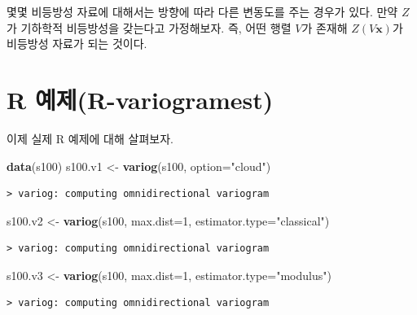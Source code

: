 \documentclass[b5paper,]{scrbook}
\makeatletter
\newenvironment{Shaded}{\begin{snugshade}}{\end{snugshade}}
\newcommand{\DataTypeTok}[1]{\textcolor[rgb]{0.13,0.29,0.53}{#1}}
\newcommand{\DecValTok}[1]{\textcolor[rgb]{0.00,0.00,0.81}{#1}}
\newcommand{\KeywordTok}[1]{\textcolor[rgb]{0.13,0.29,0.53}{\textbf{#1}}}
\newcommand{\NormalTok}[1]{#1}
\newcommand{\StringTok}[1]{\textcolor[rgb]{0.31,0.60,0.02}{#1}}
\theoremstyle{plain}
\theoremstyle{definition}
\numberwithin{equation}{section}
\newenvironment{kframe}{%
\medskip{}
\setlength{\fboxsep}{.8em}
 \def\at@end@of@kframe{}%
 \ifinner\ifhmode%
  \def\at@end@of@kframe{\end{minipage}}%
  \begin{minipage}{\columnwidth}%
 \fi\fi%
 \def\FrameCommand##1{\hskip\@totalleftmargin \hskip-\fboxsep
 \colorbox{shadecolor}{##1}\hskip-\fboxsep
     \hskip-\linewidth \hskip-\@totalleftmargin \hskip\columnwidth}%
 \MakeFramed {\advance\hsize-\width
   \@totalleftmargin\z@ \linewidth\hsize
   \@setminipage}}%
 {\par\unskip\endMakeFramed%
 \at@end@of@kframe}
\renewenvironment{Shaded}{\begin{kframe}}{\end{kframe}}
\makeatother
\begin{document}
몇몇 비등방성 자료에 대해서는 방향에 따라 다른 변동도를 주는 경우가 있다. 만약 \(Z\)가 기하학적 비등방성을 갖는다고 가정해보자. 즉, 어떤 행렬 \(V\)가 존재해 \(Z(V\mathbf{x})\)가 비등방성 자료가 되는 것이다.

\hypertarget{r-r-variogramest}{%
\section{R 예제(R-variogramest)}\label{r-r-variogramest}}

이제 실제 R 예제에 대해 살펴보자.

\begin{Shaded}
\begin{Highlighting}[]
\KeywordTok{data}\NormalTok{(s100)}
\NormalTok{s100.v1 <-}\StringTok{ }\KeywordTok{variog}\NormalTok{(s100, }\DataTypeTok{option=}\StringTok{"cloud"}\NormalTok{)}
\end{Highlighting}
\end{Shaded}

\begin{verbatim}
> variog: computing omnidirectional variogram
\end{verbatim}

\begin{Shaded}
\begin{Highlighting}[]
\NormalTok{s100.v2 <-}\StringTok{ }\KeywordTok{variog}\NormalTok{(s100, }\DataTypeTok{max.dist=}\DecValTok{1}\NormalTok{, }\DataTypeTok{estimator.type=}\StringTok{"classical"}\NormalTok{)}
\end{Highlighting}
\end{Shaded}

\begin{verbatim}
> variog: computing omnidirectional variogram
\end{verbatim}

\begin{Shaded}
\begin{Highlighting}[]
\NormalTok{s100.v3 <-}\StringTok{ }\KeywordTok{variog}\NormalTok{(s100, }\DataTypeTok{max.dist=}\DecValTok{1}\NormalTok{, }\DataTypeTok{estimator.type=}\StringTok{"modulus"}\NormalTok{)}
\end{Highlighting}
\end{Shaded}

\begin{verbatim}
> variog: computing omnidirectional variogram
\end{verbatim}
\end{document}

